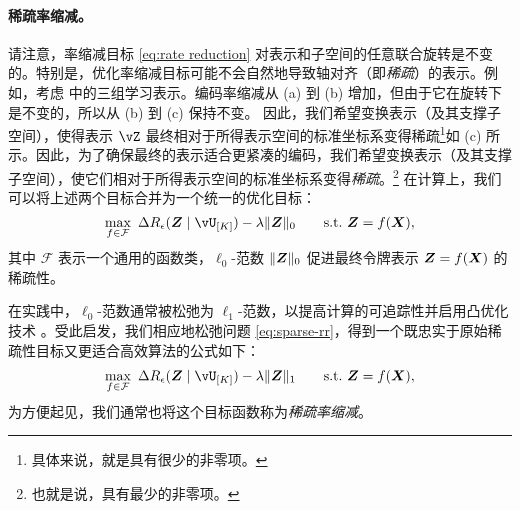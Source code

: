 \documentclass[../../book-main_zh.tex]{subfiles}
\begin{document}
\paragraph{稀疏率缩减。} 请注意，率缩减目标 \eqref{eq:rate reduction} 对表示和子空间的任意联合旋转是不变的。特别是，优化率缩减目标可能不会自然地导致轴对齐（即\textit{稀疏}）的表示。{例如，考虑  中的三组学习表示。编码率缩减从 (a) 到 (b) 增加，但由于它在旋转下是不变的，所以从 (b) 到 (c) 保持不变。} 因此，我们希望变换表示（及其支撑子空间），使得表示 $\vZ$ 最终相对于所得表示空间的标准坐标系变得稀疏\footnote{具体来说，就是具有很少的非零项。}{如 (c) 所示}。因此，为了确保最终的表示适合更紧凑的编码，我们希望变换表示（及其支撑子空间），使它们相对于所得表示空间的标准坐标系变得\textit{稀疏}。\footnote{也就是说，具有最少的非零项。} 在计算上，我们可以将上述两个目标合并为一个统一的优化目标：
\begin{equation}
   \max_{f \in \mathcal{F}}\ \Delta R_{\epsilon}(\Z \mid \vU_{[K]}) - \lambda \|\bm{Z}\|_0 \qquad \text{s.t.}\ \Z = f(\X),
   \label{eq:sparse-rr}
\end{equation}
其中 $\mathcal{F}$ 表示一个通用的函数类，$\ell_0$-范数 $\|\bm{Z}\|_0$ 促进最终令牌表示 \(\bm{Z} = f(\bm{X})\) 的稀疏性。%


在实践中，$\ell_0$-范数通常被松弛为 $\ell_1$-范数，以提高计算的可追踪性并启用凸优化技术 \cite{Wright-Ma-2022}。受此启发，我们相应地松弛问题 \eqref{eq:sparse-rr}，得到一个既忠实于原始稀疏性目标又更适合高效算法的公式如下：
\begin{equation}
\begin{aligned}
   \max_{f \in \mathcal{F}}\    \Delta R_{\epsilon}(\Z \mid \vU_{[K]}) - \lambda \|\bm{Z}\|_1  \qquad \text{s.t.}\ \Z = f(\X),
   \label{eq:sparse-rr-1}
\end{aligned}
\end{equation}
为方便起见，我们通常也将这个目标函数称为\textit{稀疏率缩减}。
\end{document}
